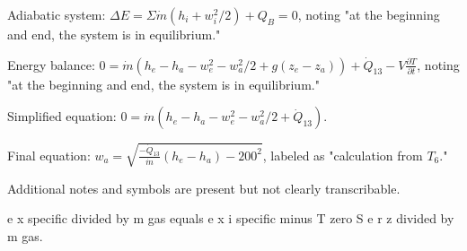 Adiabatic system:  
\( \Delta E = \Sigma \dot{m} (h_i + w_i^2 / 2) + Q_B = 0 \), noting "at the beginning and end, the system is in equilibrium."  

Energy balance:  
\( 0 = \dot{m} (h_e - h_a - w_e^2 - w_a^2 / 2 + g (z_e - z_a)) + \dot{Q}_{13} - V \frac{\partial T}{\partial t} \), noting "at the beginning and end, the system is in equilibrium."  

Simplified equation:  
\( 0 = \dot{m} (h_e - h_a - w_e^2 - w_a^2 / 2 + \dot{Q}_{13}) \).  

Final equation:  
\( w_a = \sqrt{\frac{-\dot{Q}_{13}}{\dot{m}} (h_e - h_a) - 200^2} \), labeled as "calculation from \( T_6 \)."  

Additional notes and symbols are present but not clearly transcribable.

e x specific divided by m gas equals e x i specific minus T zero S e r z divided by m gas.